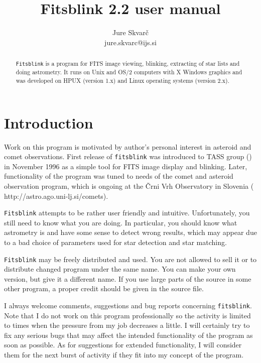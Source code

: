 \documentclass[11pt]{article}
\title{Fitsblink 2.2 user manual}
\author{Jure Skvar\v{c}\\jure.skvarc@ijs.si}
\begin{document}
\maketitle

\begin{abstract}
\verb=Fitsblink= is a program for FITS image viewing, blinking,
extracting of star lists and doing astrometry.  It runs on Unix and
OS/2 computers with X Windows graphics and was developed on HPUX
(version 1.x) and Linux operating systems (version 2.x). 
\end{abstract}

\newpage
\tableofcontents
\newpage
\section{Introduction}

Work on this program is motivated by author's personal interest in
asteroid and comet observations.  First release of \verb=fitsblink=
was introduced to TASS group
()
in November 1996 as a simple tool for FITS image display and blinking.
Later, functionality of the program was tuned to needs of the comet
and asteroid observation program, which is ongoing at the \v{C}rni Vrh
Observatory in Slovenia
(
{http://astro.ago.uni-lj.si/comets}).

\verb=Fitsblink= attempts to be rather user friendly and
intuitive. Unfortunately, you still need to know what you are doing.
In particular, you should know what astrometry is and have some sense
to detect wrong results, which may appear due to a bad choice of
parameters used for star detection and star matching.

\verb=Fitsblink= may be freely distributed and used.  You are not
allowed to sell it or to distribute changed program under the same
name.  You can make your own version, but give it a different name. If
you use large parts of the source in some other program, a proper
credit should be given in the source file.

I always welcome comments, suggestions and bug reports concerning
\verb=fitsblink=.  Note that I do not work on this program
professionally so the activity is limited to times when the pressure
from my job decreases a little.  I will certainly try to fix any
serious bugs that may affect the intended functionality of the program
as soon as possible.  As for suggestions for extended functionality, I
will consider them for the next burst of activity if they fit into my
concept of the program.
\end{document}
